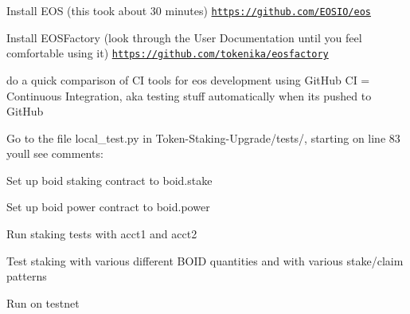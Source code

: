 
\begin{DoxyEnumerate}
\item Install E\+OS (this took about 30 minutes) \href{https://github.com/EOSIO/eos}{\tt https\+://github.\+com/\+E\+O\+S\+I\+O/eos}
\item Install E\+O\+S\+Factory (look through the User Documentation until you feel comfortable using it) \href{https://github.com/tokenika/eosfactory}{\tt https\+://github.\+com/tokenika/eosfactory}
\item do a quick comparison of CI tools for eos development using Git\+Hub CI = Continuous Integration, aka testing stuff automatically when it\textquotesingle{}s pushed to Git\+Hub
\item Go to the file local\+\_\+test.\+py in Token-\/\+Staking-\/\+Upgrade/tests/, starting on line 83 you\textquotesingle{}ll see comments\+:

Set up boid staking contract to boid.\+stake

Set up boid power contract to boid.\+power

Run staking tests with acct1 and acct2
\item Test staking with various different B\+O\+ID quantities and with various stake/claim patterns
\item Run on testnet 
\end{DoxyEnumerate}
